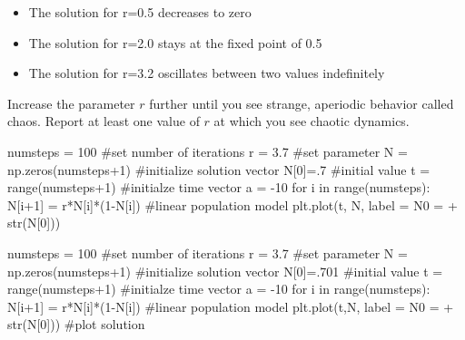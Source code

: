 \documentclass[
  letterpaper,
  DIV=11,
  numbers=noendperiod]{scrreprt}
\newenvironment{Shaded}{\begin{snugshade}}{\end{snugshade}}
\newcommand{\BuiltInTok}[1]{\textcolor[rgb]{0.00,0.23,0.31}{#1}}
\newcommand{\CommentTok}[1]{\textcolor[rgb]{0.37,0.37,0.37}{#1}}
\newcommand{\ControlFlowTok}[1]{\textcolor[rgb]{0.00,0.23,0.31}{#1}}
\newcommand{\DecValTok}[1]{\textcolor[rgb]{0.68,0.00,0.00}{#1}}
\newcommand{\FloatTok}[1]{\textcolor[rgb]{0.68,0.00,0.00}{#1}}
\newcommand{\KeywordTok}[1]{\textcolor[rgb]{0.00,0.23,0.31}{#1}}
\newcommand{\NormalTok}[1]{\textcolor[rgb]{0.00,0.23,0.31}{#1}}
\newcommand{\OperatorTok}[1]{\textcolor[rgb]{0.37,0.37,0.37}{#1}}
\newcommand{\StringTok}[1]{\textcolor[rgb]{0.13,0.47,0.30}{#1}}
\providecommand{\tightlist}{%
  \setlength{\itemsep}{0pt}\setlength{\parskip}{0pt}}\usepackage{longtable,booktabs,array}
\begin{document}
\begin{itemize}
\tightlist
\item
  The solution for r=0.5 decreases to zero
\item
  The solution for r=2.0 stays at the fixed point of 0.5
\item
  The solution for r=3.2 oscillates between two values indefinitely
\end{itemize}

Increase the parameter \(r\) further until you see strange, aperiodic
behavior called chaos. Report at least one value of \(r\) at which you
see chaotic dynamics.

\begin{Shaded}
\begin{Highlighting}[]
\NormalTok{numsteps }\OperatorTok{=} \DecValTok{100} \CommentTok{\#set number of iterations}
\NormalTok{r }\OperatorTok{=} \FloatTok{3.7} \CommentTok{\#set parameter}
\NormalTok{N }\OperatorTok{=}\NormalTok{ np.zeros(numsteps}\OperatorTok{+}\DecValTok{1}\NormalTok{) }\CommentTok{\#initialize solution vector}
\NormalTok{N[}\DecValTok{0}\NormalTok{]}\OperatorTok{=}\FloatTok{.7} \CommentTok{\#initial value}
\NormalTok{t }\OperatorTok{=} \BuiltInTok{range}\NormalTok{(numsteps}\OperatorTok{+}\DecValTok{1}\NormalTok{) }\CommentTok{\#initialze time vector}
\NormalTok{a }\OperatorTok{=} \OperatorTok{{-}}\DecValTok{10}
\ControlFlowTok{for}\NormalTok{ i }\KeywordTok{in} \BuiltInTok{range}\NormalTok{(numsteps):}
\NormalTok{    N[i}\OperatorTok{+}\DecValTok{1}\NormalTok{] }\OperatorTok{=}\NormalTok{ r}\OperatorTok{*}\NormalTok{N[i]}\OperatorTok{*}\NormalTok{(}\DecValTok{1}\OperatorTok{{-}}\NormalTok{N[i]) }\CommentTok{\#linear population model}
\NormalTok{plt.plot(t, N, label }\OperatorTok{=} \StringTok{\textquotesingle{}N0 =\textquotesingle{}} \OperatorTok{+} \BuiltInTok{str}\NormalTok{(N[}\DecValTok{0}\NormalTok{]))}

\NormalTok{numsteps }\OperatorTok{=} \DecValTok{100} \CommentTok{\#set number of iterations}
\NormalTok{r }\OperatorTok{=} \FloatTok{3.7} \CommentTok{\#set parameter}
\NormalTok{N }\OperatorTok{=}\NormalTok{ np.zeros(numsteps}\OperatorTok{+}\DecValTok{1}\NormalTok{) }\CommentTok{\#initialize solution vector}
\NormalTok{N[}\DecValTok{0}\NormalTok{]}\OperatorTok{=}\FloatTok{.701} \CommentTok{\#initial value}
\NormalTok{t }\OperatorTok{=} \BuiltInTok{range}\NormalTok{(numsteps}\OperatorTok{+}\DecValTok{1}\NormalTok{) }\CommentTok{\#initialze time vector}
\NormalTok{a }\OperatorTok{=} \OperatorTok{{-}}\DecValTok{10}
\ControlFlowTok{for}\NormalTok{ i }\KeywordTok{in} \BuiltInTok{range}\NormalTok{(numsteps):}
\NormalTok{    N[i}\OperatorTok{+}\DecValTok{1}\NormalTok{] }\OperatorTok{=}\NormalTok{ r}\OperatorTok{*}\NormalTok{N[i]}\OperatorTok{*}\NormalTok{(}\DecValTok{1}\OperatorTok{{-}}\NormalTok{N[i]) }\CommentTok{\#linear population model}
\NormalTok{plt.plot(t,N, label }\OperatorTok{=} \StringTok{\textquotesingle{}N0 =\textquotesingle{}} \OperatorTok{+} \BuiltInTok{str}\NormalTok{(N[}\DecValTok{0}\NormalTok{])) }\CommentTok{\#plot solution}


\end{Highlighting}
\end{Shaded}
\end{document}
